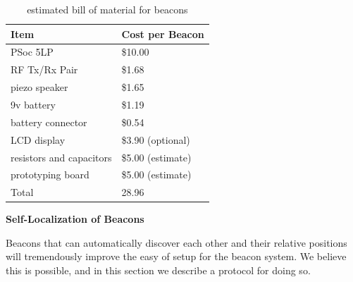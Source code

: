 \documentclass{article}
\begin{document}
      \begin{table}
        \label{table:beacon_bom}
        \begin{tabular}{|l|l|}
          \hline
          Item & Cost per Beacon \\
          \hline
          PSoc 5LP & \$10.00 \\
          RF Tx/Rx Pair & \$1.68 \\
          piezo speaker & \$1.65 \\
          9v battery & \$1.19 \\
          battery connector & \$0.54 \\
          LCD display & \$3.90 (optional) \\
          resistors and capacitors & \$5.00 (estimate) \\
          prototyping board & \$5.00 (estimate) \\
          \hline
          Total & 28.96 \\
          \hline
        \end{tabular}
        \caption{estimated bill of material for beacons}
      \end{table}

      \textbf{Self-Localization of Beacons} \label{section:beacon_self_localization}

      Beacons that can automatically discover each other and their relative positions will tremendously improve the easy of setup for the beacon system. We believe this is possible, and in this section we describe a protocol for doing so.
\end{document}
